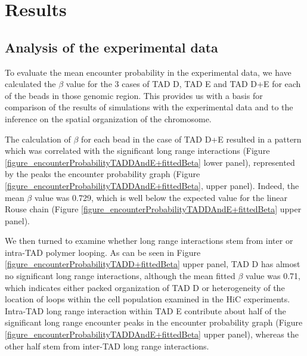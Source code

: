 \documentclass[12pt]{article}
\begin{document}






\section{Results}\label{section_results}
\subsection{Analysis of the experimental data}\label{subsection_analysisOfTheExperimentalData}

To evaluate the mean encounter probability in the experimental data, we have calculated the $\beta$ value for the 3 cases of TAD D, TAD E and TAD D+E for each of the beads in those genomic region. This provides us with a basis for comparison of the results of simulations with the experimental data and to the inference on the spatial organization of the chromosome.

The calculation of $\beta$ for each bead in the case of TAD D+E resulted in a pattern which was correlated with the significant long range interactions (Figure \ref{figure_encounterProbabilityTADDAndE+fittedBeta} lower panel), represented by the peaks the encounter probability graph (Figure \ref{figure_encounterProbabilityTADDAndE+fittedBeta}, upper panel). Indeed, the mean $\beta$ value was 0.729, which is well below the expected value for the linear Rouse chain (Figure \ref{figure_encounterProbabilityTADDAndE+fittedBeta} upper panel).

We then turned to examine whether long range interactions stem from inter or intra-TAD polymer looping. As can be seen in Figure \ref{figure_encounterProbabilityTADD+fittedBeta} upper panel, TAD D has almost no significant long range interactions, although the mean fitted $\beta$ value was 0.71, which indicates either packed organization of TAD D or heterogeneity of the location of loops within the cell population examined in the HiC experiments.
Intra-TAD long range interaction within TAD E contribute about half of the significant long range encounter peaks in the encounter probability graph (Figure \ref{figure_encounterProbabilityTADDAndE+fittedBeta} upper panel), whereas the other half stem from inter-TAD long range interactions.
\end{document}
